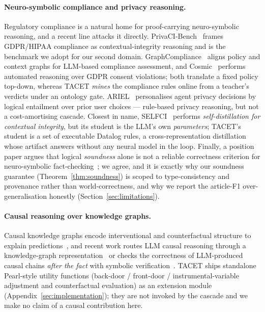 \documentclass[11pt]{article}
\theoremstyle{plain}
\begin{document}
\paragraph{Neuro-symbolic compliance and privacy reasoning.} Regulatory
compliance is a natural home for proof-carrying neuro-symbolic reasoning, and a
recent line attacks it directly. PrivaCI-Bench~\citep{privacibench2025} frames
GDPR/HIPAA compliance as contextual-integrity reasoning and is the benchmark we
adopt for our second domain. GraphCompliance~\citep{graphcompliance2025} aligns
policy and context graphs for LLM-based compliance assessment, and
Cosmic~\citep{cosmicgdpr2026} performs automated reasoning over GDPR consent
violations; both translate a fixed policy top-down, whereas TACET \emph{mines}
the compliance rules online from a teacher's verdicts under an ontology gate.
ARIEL~\citep{arielprivacy2025} personalises agent privacy decisions by logical
entailment over prior user choices --- rule-based privacy reasoning, but not a
cost-amortising cascade. Closest in name, SELFCI~\citep{selfci2026} performs
\emph{self-distillation for contextual integrity}, but its student is the LLM's
own \emph{parameters}; TACET's student is a set of executable Datalog rules,
a cross-representation distillation whose artifact answers without any neural
model in the loop. Finally, a position paper argues that logical
\emph{soundness} alone is not a reliable correctness criterion for
neuro-symbolic fact-checking~\citep{soundnessnotreliable2026}; we agree, and it
is exactly why our soundness guarantee (Theorem~\ref{thm:soundness}) is scoped
to type-consistency and provenance rather than world-correctness, and why we
report the article-F1 over-generalisation honestly (Section~\ref{sec:limitations}).

\paragraph{Causal reasoning over knowledge graphs.} Causal knowledge graphs
encode interventional and counterfactual structure to explain
predictions~\citep{causalkg2022}, and recent work routes LLM causal
reasoning through a knowledge-graph representation~\citep{causalkgllm2024} or
checks the correctness of LLM-produced causal chains \emph{after the fact}
with symbolic verification~\citep{doverifier2026}. TACET ships standalone
Pearl-style utility functions (back-door / front-door / instrumental-variable
adjustment and counterfactual evaluation) as an extension module
(Appendix~\ref{sec:implementation}); they are not invoked by the cascade and we
make no claim of a causal contribution here.
\end{document}
